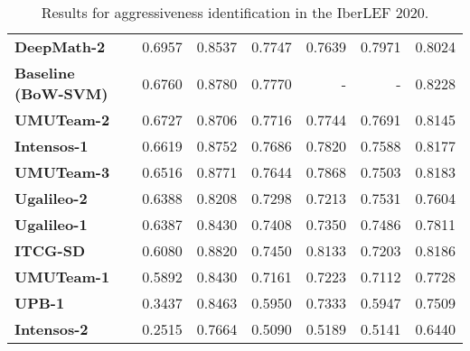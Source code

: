\begin{table}[H]
\begin{tabular}{lrrrrrr}
        \textbf{DeepMath-2}         & 0.6957                & 0.8537                    & 0.7747            & 0.7639             & 0.7971          & 0.8024            \\[0.05cm]
        \textbf{Baseline (BoW-SVM)} & 0.6760                & 0.8780                    & 0.7770            & -                  & -               & 0.8228            \\[0.05cm]
        \textbf{UMUTeam-2}          & 0.6727                & 0.8706                    & 0.7716            & 0.7744             & 0.7691          & 0.8145            \\[0.05cm]
        \textbf{Intensos-1}         & 0.6619                & 0.8752                    & 0.7686            & 0.7820             & 0.7588          & 0.8177            \\[0.05cm]
        \textbf{UMUTeam-3}          & 0.6516                & 0.8771                    & 0.7644            & 0.7868             & 0.7503          & 0.8183            \\[0.05cm]
        \textbf{Ugalileo-2}         & 0.6388                & 0.8208                    & 0.7298            & 0.7213             & 0.7531          & 0.7604            \\[0.05cm]
        \textbf{Ugalileo-1}         & 0.6387                & 0.8430                    & 0.7408            & 0.7350             & 0.7486          & 0.7811            \\[0.05cm]
        \textbf{ITCG-SD}            & 0.6080                & 0.8820                    & 0.7450            & 0.8133             & 0.7203          & 0.8186            \\[0.05cm]
        \textbf{UMUTeam-1}          & 0.5892                & 0.8430                    & 0.7161            & 0.7223             & 0.7112          & 0.7728            \\[0.05cm]
        \textbf{UPB-1}              & 0.3437                & 0.8463                    & 0.5950            & 0.7333             & 0.5947          & 0.7509            \\[0.05cm]
        \textbf{Intensos-2}         & 0.2515                & 0.7664                    & 0.5090            & 0.5189             & 0.5141          & 0.6440            \\[0.05cm] \hline
    \end{tabular}
    \normalsize
    \caption{Results for aggressiveness identification in the IberLEF 2020.}
    \label{table:agIberLEF_2020}
\end{table}